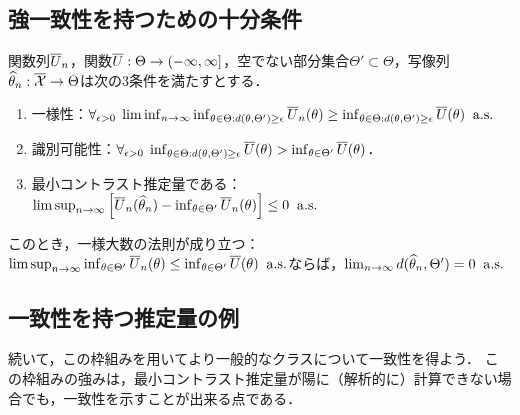 \documentclass[uplatex,dvipdfmx]{jsreport}
\begin{document}
\subsection{強一致性を持つための十分条件}

\begin{theorem}[最小コントラスト推定量が強一致性を持つための十分条件]
    関数列$\overline{U}_n$，関数$\overline{U}:\Theta\to(-\infty,\infty]$，空でない部分集合$\Theta'\subset\Theta$，写像列$\widehat{\theta}_n:\overline{\mathcal{X}}\to\Theta$は次の3条件を満たすとする．
    \begin{enumerate}[({C}1)]
        \item 一様性：$\forall_{\epsilon>0}\;\liminf_{n\to\infty}\inf_{\theta\in\Theta:d(\theta,\Theta')\ge\epsilon}\overline{U}_n(\theta)\ge\inf_{\theta\in\Theta:d(\theta,\Theta')\ge\epsilon}\overline{U}(\theta)\;\;\mathrm{a.s.}$
        \item 識別可能性：$\forall_{\epsilon>0}\;\inf_{\theta\in\Theta:d(\theta,\Theta')\ge\epsilon}\overline{U}(\theta)>\inf_{\theta\in\Theta'}\overline{U}(\theta)$．
        \item 最小コントラスト推定量である：$\limsup_{n\to\infty}\left[\overline{U}_n(\widehat{\theta}_n)-\inf_{\theta\in\Theta'}\overline{U}_n(\theta)\right]\le0\;\;\mathrm{a.s.}$
    \end{enumerate}
    このとき，一様大数の法則が成り立つ：$\limsup_{n\to\infty}\inf_{\theta\in\Theta'}\overline{U}_n(\theta)\le\inf_{\theta\in\Theta'}\overline{U}(\theta)\;\;\mathrm{a.s.}$ならば，$\lim_{n\to\infty}d(\widehat{\theta}_n,\Theta')=0\;\;\mathrm{a.s.}$
\end{theorem}

\subsection{一致性を持つ推定量の例}

\begin{tcolorbox}[colframe=ForestGreen, colback=ForestGreen!10!white,breakable,colbacktitle=ForestGreen!40!white,coltitle=black,fonttitle=\bfseries\sffamily,
title=]
続いて，この枠組みを用いてより一般的なクラスについて一致性を得よう．
この枠組みの強みは，最小コントラスト推定量が陽に（解析的に）計算できない場合でも，一致性を示すことが出来る点である．
\end{tcolorbox}
\end{document}
